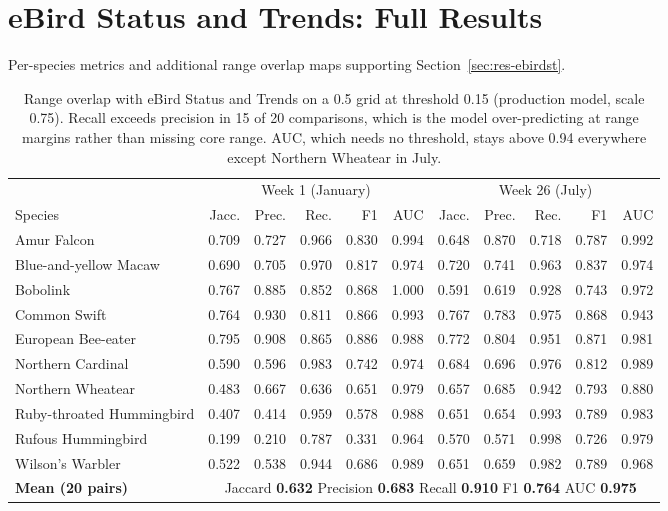 \section{eBird Status and Trends: Full Results}
\label{sec:H-ebirdst-full-results}

Per-species metrics and additional range overlap maps supporting Section~\ref{sec:res-ebirdst}.

\begin{table}[H]
\centering
\caption{Range overlap with eBird Status and Trends on a 0.5\textdegree{} grid at threshold 0.15 (production model, scale 0.75). Recall exceeds precision in 15 of 20 comparisons, which is the model over-predicting at range margins rather than missing core range. AUC, which needs no threshold, stays above 0.94 everywhere except Northern Wheatear in July.}
\label{tab:ebirdst}
\footnotesize
\begin{tabular}{l rrrrr rrrrr}
\toprule
& \multicolumn{5}{c}{Week 1 (January)} & \multicolumn{5}{c}{Week 26 (July)} \\
\cmidrule(lr){2-6}\cmidrule(l){7-11}
Species & Jacc. & Prec. & Rec. & F1 & AUC & Jacc. & Prec. & Rec. & F1 & AUC \\
\midrule
Amur Falcon & 0.709 & 0.727 & 0.966 & 0.830 & 0.994 & 0.648 & 0.870 & 0.718 & 0.787 & 0.992 \\
Blue-and-yellow Macaw & 0.690 & 0.705 & 0.970 & 0.817 & 0.974 & 0.720 & 0.741 & 0.963 & 0.837 & 0.974 \\
Bobolink & 0.767 & 0.885 & 0.852 & 0.868 & 1.000 & 0.591 & 0.619 & 0.928 & 0.743 & 0.972 \\
Common Swift & 0.764 & 0.930 & 0.811 & 0.866 & 0.993 & 0.767 & 0.783 & 0.975 & 0.868 & 0.943 \\
European Bee-eater & 0.795 & 0.908 & 0.865 & 0.886 & 0.988 & 0.772 & 0.804 & 0.951 & 0.871 & 0.981 \\
Northern Cardinal & 0.590 & 0.596 & 0.983 & 0.742 & 0.974 & 0.684 & 0.696 & 0.976 & 0.812 & 0.989 \\
Northern Wheatear & 0.483 & 0.667 & 0.636 & 0.651 & 0.979 & 0.657 & 0.685 & 0.942 & 0.793 & 0.880 \\
Ruby-throated Hummingbird & 0.407 & 0.414 & 0.959 & 0.578 & 0.988 & 0.651 & 0.654 & 0.993 & 0.789 & 0.983 \\
Rufous Hummingbird & 0.199 & 0.210 & 0.787 & 0.331 & 0.964 & 0.570 & 0.571 & 0.998 & 0.726 & 0.979 \\
Wilson's Warbler & 0.522 & 0.538 & 0.944 & 0.686 & 0.989 & 0.651 & 0.659 & 0.982 & 0.789 & 0.968 \\
\midrule
\textbf{Mean (20 pairs)} & \multicolumn{10}{c}{Jaccard \textbf{0.632} \quad Precision \textbf{0.683} \quad Recall \textbf{0.910} \quad F1 \textbf{0.764} \quad AUC \textbf{0.975}} \\
\bottomrule
\end{tabular}
\end{table}

